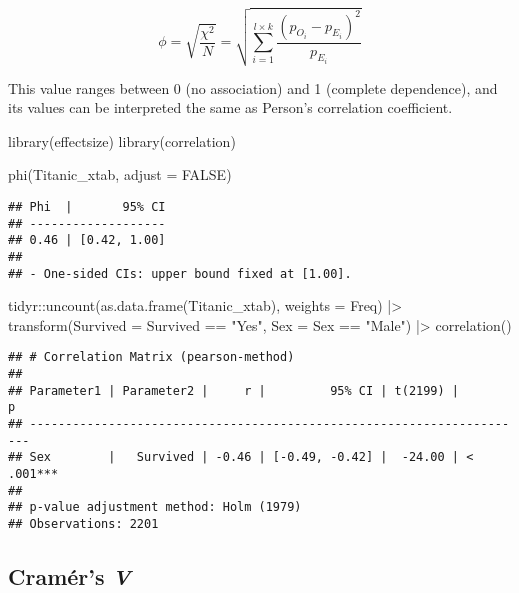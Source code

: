 \documentclass[
]{article}
\newenvironment{Shaded}{\begin{snugshade}}{\end{snugshade}}
\newcommand{\AttributeTok}[1]{\textcolor[rgb]{0.77,0.63,0.00}{#1}}
\newcommand{\ConstantTok}[1]{\textcolor[rgb]{0.00,0.00,0.00}{#1}}
\newcommand{\FunctionTok}[1]{\textcolor[rgb]{0.00,0.00,0.00}{#1}}
\newcommand{\NormalTok}[1]{#1}
\newcommand{\SpecialCharTok}[1]{\textcolor[rgb]{0.00,0.00,0.00}{#1}}
\newcommand{\StringTok}[1]{\textcolor[rgb]{0.31,0.60,0.02}{#1}}
\begin{document}
\[
\phi = \sqrt{\frac{\chi^2}{N}} = \sqrt{\sum_{i=1}^{l\times k}{\frac{(p_{O_i}-p_{E_i})^2}{p_{E_i}}}}
\]

This value ranges between 0 (no association) and 1 (complete
dependence), and its values can be interpreted the same as Person's
correlation coefficient.

\begin{Shaded}
\begin{Highlighting}[]
\FunctionTok{library}\NormalTok{(effectsize)}
\FunctionTok{library}\NormalTok{(correlation)}

\FunctionTok{phi}\NormalTok{(Titanic\_xtab, }\AttributeTok{adjust =} \ConstantTok{FALSE}\NormalTok{)}
\end{Highlighting}
\end{Shaded}

\begin{verbatim}
## Phi  |       95% CI
## -------------------
## 0.46 | [0.42, 1.00]
## 
## - One-sided CIs: upper bound fixed at [1.00].
\end{verbatim}

\begin{Shaded}
\begin{Highlighting}[]
\NormalTok{tidyr}\SpecialCharTok{::}\FunctionTok{uncount}\NormalTok{(}\FunctionTok{as.data.frame}\NormalTok{(Titanic\_xtab), }\AttributeTok{weights =}\NormalTok{ Freq) }\SpecialCharTok{|\textgreater{}}
  \FunctionTok{transform}\NormalTok{(}\AttributeTok{Survived =}\NormalTok{ Survived }\SpecialCharTok{==} \StringTok{"Yes"}\NormalTok{,}
            \AttributeTok{Sex =}\NormalTok{ Sex }\SpecialCharTok{==} \StringTok{"Male"}\NormalTok{) }\SpecialCharTok{|\textgreater{}} 
  \FunctionTok{correlation}\NormalTok{()}
\end{Highlighting}
\end{Shaded}

\begin{verbatim}
## # Correlation Matrix (pearson-method)
## 
## Parameter1 | Parameter2 |     r |         95% CI | t(2199) |         p
## ----------------------------------------------------------------------
## Sex        |   Survived | -0.46 | [-0.49, -0.42] |  -24.00 | < .001***
## 
## p-value adjustment method: Holm (1979)
## Observations: 2201
\end{verbatim}

\hypertarget{cramuxe9rs-v}{%
\subsection{\texorpdfstring{Cramér's
\emph{V}}{Cramér's V}}\label{cramuxe9rs-v}}
\end{document}
